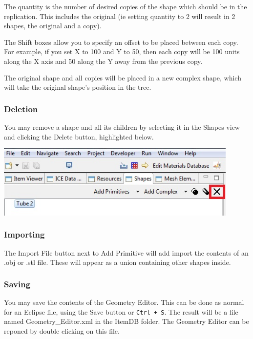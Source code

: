 The quantity is the number of desired copies of the shape which should be in the
replication. This includes the original (ie setting quantity to 2 will result in
2 shapes, the original and a copy).

The Shift boxes allow you to specify an offset to be placed between each copy.
For example, if you set X to 100 and Y to 50, then each copy will be 100 units
along the X axis and 50 along the Y away from the previous copy. 

The original shape and all copies will be placed in a new complex shape, which
will take the original shape's position in the tree.

\subsubsection{Deletion}

You may remove a shape and all its children by selecting it in the Shapes view
and clicking the Delete button, highlighted below.

\begin{center}
\includegraphics[width=12cm]{images/GeometryDeleteButton.jpg}
\end{center}

\subsubsection{Importing}

The Import File button next to Add Primitive will add import the contents of an
.obj or .stl file. These will appear as a union containing other shapes inside. 

\subsubsection{Saving}

You may save the contents of the Geometry Editor. This can be done as normal for
an Eclipse file, using the Save button or \texttt{Ctrl + S}. The result will be
a file named Geometry\_Editor.xml in the ItemDB folder. The Geometry Editor can be
reponed by double clicking on this file. 
